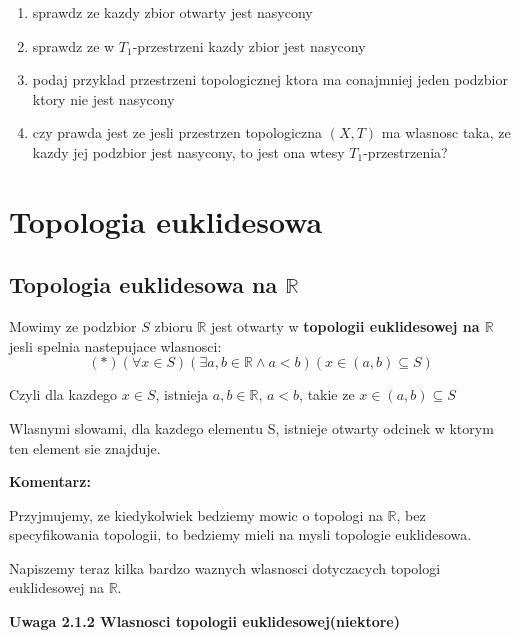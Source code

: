 \documentclass{article}
\begin{document}
\begin{enumerate}[align=left]
        \begin{enumerate}[label=(\alph*)]
            \item sprawdz ze kazdy zbior otwarty jest nasycony
            \item sprawdz ze w $T_{1}$-przestrzeni kazdy zbior jest nasycony
            \item podaj przyklad przestrzeni topologicznej ktora ma conajmniej jeden podzbior ktory nie jest nasycony
            \item czy prawda jest ze jesli przestrzen topologiczna $(X,T)$ ma wlasnosc taka, ze kazdy jej podzbior jest nasycony, to jest ona wtesy $T_{1}$-przestrzenia?
            
        \end{enumerate}
\end{enumerate}%

\section{Topologia euklidesowa}
\subsection{Topologia euklidesowa na $\mathbb{R}$}

\begin{tcolorbox}[colback=white!90!red,colframe=black!35!red,title=2.1.1 Definicja: Topologia euklidesowa na $\mathbb{R}$]
    Mowimy ze podzbior $S$ zbioru $\mathbb{R}$ jest otwarty w \textbf{topologii euklidesowej na $\mathbb{R}$} jesli spelnia nastepujace wlasnosci:
    $$(*)(\forall x \in S)(\exists a,b \in \mathbb{R}\land a<b)(x \in (a,b) \subseteq S)$$

    Czyli dla kazdego $x \in S$, istnieja $a,b \in \mathbb{R}$, $a<b$, takie ze $x \in (a,b) \subseteq S$

    Wlasnymi slowami, dla kazdego elementu S, istnieje otwarty odcinek w ktorym ten element sie znajduje.
\end{tcolorbox}

\textbf{Komentarz:}

Przyjmujemy, ze kiedykolwiek bedziemy mowic o topologi na $\mathbb{R}$, bez specyfikowania topologii, to bedziemy mieli na mysli topologie euklidesowa.

Napiszemy teraz kilka bardzo waznych wlasnosci dotyczacych topologi euklidesowej na $\mathbb{R}$.


\textbf{Uwaga 2.1.2 Wlasnosci topologii euklidesowej(niektore)}
\end{document}
